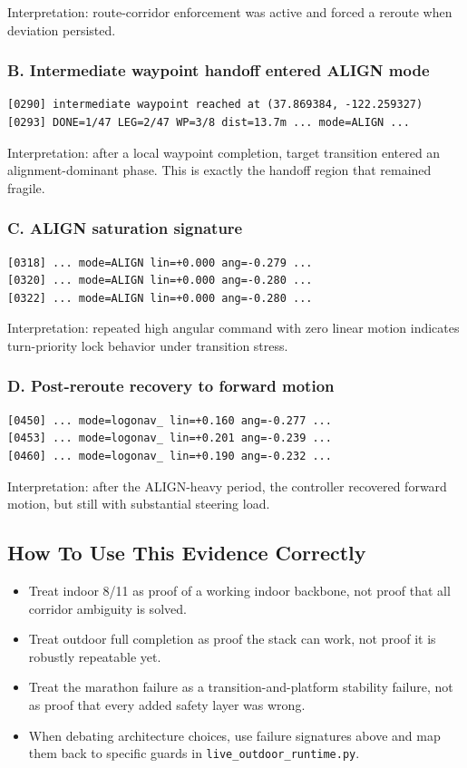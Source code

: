 \documentclass[11pt]{article}
\begin{document}
Interpretation: route-corridor enforcement was active and forced a reroute when
deviation persisted.

\subsubsection*{B. Intermediate waypoint handoff entered ALIGN mode}
\begin{verbatim}
[0290] intermediate waypoint reached at (37.869384, -122.259327)
[0293] DONE=1/47 LEG=2/47 WP=3/8 dist=13.7m ... mode=ALIGN ...
\end{verbatim}

Interpretation: after a local waypoint completion, target transition entered an
alignment-dominant phase. This is exactly the handoff region that remained fragile.

\subsubsection*{C. ALIGN saturation signature}
\begin{verbatim}
[0318] ... mode=ALIGN lin=+0.000 ang=-0.279 ...
[0320] ... mode=ALIGN lin=+0.000 ang=-0.280 ...
[0322] ... mode=ALIGN lin=+0.000 ang=-0.280 ...
\end{verbatim}

Interpretation: repeated high angular command with zero linear motion indicates
turn-priority lock behavior under transition stress.

\subsubsection*{D. Post-reroute recovery to forward motion}
\begin{verbatim}
[0450] ... mode=logonav_ lin=+0.160 ang=-0.277 ...
[0453] ... mode=logonav_ lin=+0.201 ang=-0.239 ...
[0460] ... mode=logonav_ lin=+0.190 ang=-0.232 ...
\end{verbatim}

Interpretation: after the ALIGN-heavy period, the controller recovered forward
motion, but still with substantial steering load.

\subsection{How To Use This Evidence Correctly}

\begin{itemize}[nosep]
  \item Treat indoor 8/11 as proof of a working indoor backbone, not proof that
  all corridor ambiguity is solved.
  \item Treat outdoor full completion as proof the stack can work, not proof it is
  robustly repeatable yet.
  \item Treat the marathon failure as a transition-and-platform stability failure,
  not as proof that every added safety layer was wrong.
  \item When debating architecture choices, use failure signatures above and map
  them back to specific guards in \texttt{live\_outdoor\_runtime.py}.
\end{itemize}
\end{document}
